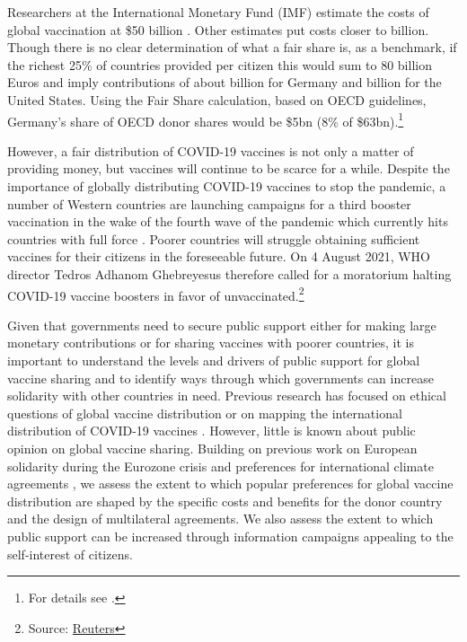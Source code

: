 \documentclass[12pt,oneside]{article}
\begin{document}
Researchers at the International Monetary Fund (IMF) estimate the costs of global vaccination at \$50 billion \citep{agarwal2021proposal}. Other estimates put costs closer to  billion.  Though there is no clear determination of what a fair share is, as a benchmark, if the richest 25\% of countries provided  per citizen this would sum to 80 billion Euros and imply contributions of about  billion for Germany and  billion for the United States. Using the Fair Share calculation, based on OECD guidelines, Germany's share of OECD donor shares would be \$5bn (8\% of \$63bn).\footnote{For details see \citet{care2021}.}  



However, a fair distribution of COVID-19 vaccines is not only a matter of providing money, but vaccines will continue to be scarce for a while. Despite the importance of globally distributing COVID-19 vaccines to stop the pandemic, a number of Western countries are launching campaigns for a third booster vaccination in the wake of the fourth wave of the pandemic which currently hits countries with full force \citep{Mahase2021}. Poorer countries will struggle obtaining  sufficient vaccines for their citizens in the foreseeable future. On 4 August 2021, WHO director Tedros Adhanom Ghebreyesus therefore called for a moratorium halting COVID-19 vaccine boosters in favor of unvaccinated.\footnote{Source: \href{https://www.reuters.com/business/healthcare-pharmaceuticals/who-calls-moratorium-covid-19-vaccine-booster-doses-until-september-end-2021-08-04/}{Reuters}} 



Given that governments need to secure public support either for making large monetary contributions or for sharing vaccines with poorer countries, it is important to understand the levels and drivers of public support for global vaccine sharing and to identify ways through which governments can increase solidarity with other countries in need. Previous research has focused on ethical questions of global vaccine distribution \citep{Emanuel2020,Jecker2021} or on  mapping the international distribution of COVID-19 vaccines \citep[e.g.][]{Massinga2021,Katz2021}. However, little is known about public opinion on global vaccine sharing. Building on previous work on European solidarity during the Eurozone crisis \citep{Bechtel2017,Kuhn2018,Kuhn2020,Stoeckel2018} and preferences for international climate agreements \citep{Bechtel2019},  we assess the extent to which popular preferences for global vaccine distribution are shaped by the specific costs and benefits for the donor country and the design of multilateral agreements. We also assess the extent to which public support can be increased through information campaigns appealing to the self-interest of citizens. 
\end{document}
